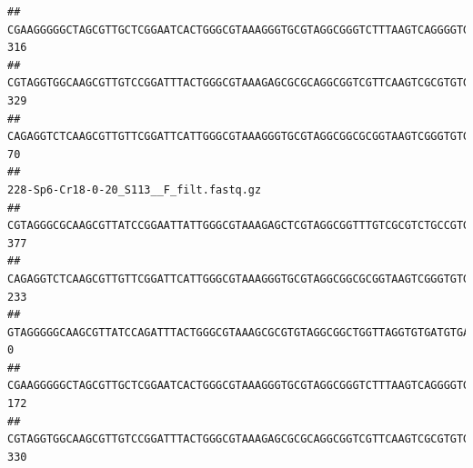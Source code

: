 \documentclass[]{article}
\begin{document}
\begin{verbatim}
## CGAAGGGGGCTAGCGTTGCTCGGAATCACTGGGCGTAAAGGGTGCGTAGGCGGGTCTTTAAGTCAGGGGTGAAATCCTGGAGCTCAACTCCAGAACTGCCTTTGATACTGAAGATCTTGAGTTCGGGAGAGGTGAGTGGAACTGCGAGTGTAGAGGTGAAATTCGTAGATATTCGCAAGAACACCAGTGGCGAAGGCGGCTCACTGGCCCGATACTGACGCTGAGGCACGAAAGCGTGGGGAGCAAACA                                     316
## CGTAGGTGGCAAGCGTTGTCCGGATTTACTGGGCGTAAAGAGCGCGCAGGCGGTCGTTCAAGTCGCGTGTGAAAGCCCCCGGCTCAACTGGGGAGGGTCACGCGATACTGATCGACTCGAAGGCAGGAGAGGGTAGTGGAATTCCCGGTGTAGTGGTGAAATGCGTAGATATCGGGAGGAACACCAGTGGCGAAGGCGACTACCTGGCCTGTTCTTGACGCTGAGGCGCGAAAGCTAGGGGAGCAAACG                                     329
## CAGAGGTCTCAAGCGTTGTTCGGATTCATTGGGCGTAAAGGGTGCGTAGGCGGCGCGGTAAGTCGGGTGTGAAATCTCGGGGCTTAACTCCGAAACTGCATTCGATACTGCCGTGCTTGAGGACTGGAGAGGAGACTGGAATTTACGGTGTAGCGGTGAAATGCGTAGATATCGTAAGGAAGACCAGTGGCGAAGGCGGGTCTCTGGACAGTTCCTGACGCTGAGGCACGAAGGCCAGGGGAGCAAACG                                      70
##                                                                                                                                                                                                                                                           228-Sp6-Cr18-0-20_S113__F_filt.fastq.gz
## CGTAGGGCGCAAGCGTTATCCGGAATTATTGGGCGTAAAGAGCTCGTAGGCGGTTTGTCGCGTCTGCCGTGAAAGTCCGGGGCTCAACTCCGGATCTGCGGTGGGTACGGGCAGACTAGAGTGATGTAGGGGAGACTGGAATTCCTGGTGTAGCGGTGAAATGCGCAGATATCAGGAGGAACACCGATGGCGAAGGCAGGTCTCTGGGCATTAACTGACGCTGAGGAGCGAAAGCATGGGGAGCGAACA                                     377
## CAGAGGTCTCAAGCGTTGTTCGGATTCATTGGGCGTAAAGGGTGCGTAGGCGGCGCGGTAAGTCGGGTGTGAAATCTCGGAGCTTAACTCCGAAACTGCATTCGATACTGCCGTGCTTGAGGACTGGAGAGGAGACTGGAATTTACGGTGTAGCGGTGAAATGCGTAGATATCGTAAGGAAGACCAGTGGCGAAGGCGGGTCTCTGGACAGTTCCTGACGCTGAGGCACGAAGGCCAGGGGAGCAAACG                                     233
## GTAGGGGGCAAGCGTTATCCAGATTTACTGGGCGTAAAGCGCGTGTAGGCGGCTGGTTAGGTGTGATGTGAAATCTTCCGGCTCAACCGGAAAACTGCATTGCAAACCGGCCTGGCTAGAGTGCAGGAGAGGGAAGCGGAATTCCAGGTGTAGCGGTGAAATGCGTAGATATCTGGAGGAACACCAGTGGCGAAGGCGGCTTCCTGGCCTGCAACTGACGCTGAGACGCGAAAGCGTGGGGAGCGAAC                                        0
## CGAAGGGGGCTAGCGTTGCTCGGAATCACTGGGCGTAAAGGGTGCGTAGGCGGGTCTTTAAGTCAGGGGTGAAATCCTGGAGCTCAACTCCAGAACTGCCTTTGATACTGAAGATCTTGAGTTCGGGAGAGGTGAGTGGAACTGCGAGTGTAGAGGTGAAATTCGTAGATATTCGCAAGAACACCAGTGGCGAAGGCGGCTCACTGGCCCGATACTGACGCTGAGGCACGAAAGCGTGGGGAGCAAACA                                     172
## CGTAGGTGGCAAGCGTTGTCCGGATTTACTGGGCGTAAAGAGCGCGCAGGCGGTCGTTCAAGTCGCGTGTGAAAGCCCCCGGCTCAACTGGGGAGGGTCACGCGATACTGATCGACTCGAAGGCAGGAGAGGGTAGTGGAATTCCCGGTGTAGTGGTGAAATGCGTAGATATCGGGAGGAACACCAGTGGCGAAGGCGACTACCTGGCCTGTTCTTGACGCTGAGGCGCGAAAGCTAGGGGAGCAAACG                                     330

\end{verbatim}
\end{document}
